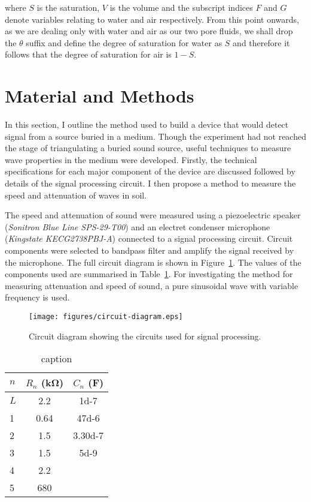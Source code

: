 \documentclass[twocolumn]{article}
\newcommand{\otoprule}{\midrule[\heavyrulewidth]}
\begin{document}
where $S$ is the saturation, $V$ is the volume and the subscript indices $F$ and $G$ denote variables relating to water and air respectively. From this point onwards, as we are dealing only with water and air as our two pore fluids, we shall drop the $\theta$ suffix and define the degree of saturation for water as $S$ and therefore it follows that the degree of saturation for air is $1 - S$.

\section{Material and Methods}
In this section, I outline the method used to build a device that would detect signal from a source buried in a medium. Though the experiment had not reached the stage of triangulating a buried sound source, useful techniques to measure wave properties in the medium were developed. Firstly, the technical specifications for each major component of the device are discussed followed by details of the signal processing circuit. I then propose a method to measure the speed and attenuation of waves in soil.

The speed and attenuation of sound were measured using a piezoelectric speaker (\textit{Sonitron Blue Line SPS-29-T00}) and an electret condenser microphone (\textit{Kingstate KECG2738PBJ-A}) connected to a signal processing circuit. Circuit components were selected to bandpass filter and amplify the signal received by the microphone. The full circuit diagram is shown in Figure~\ref{fig:circuit-diagram}. The values of the components used are summarised in Table~\ref{t:electric-components}. For investigating the method for measuring attenuation and speed of sound, a pure sinusoidal wave with variable frequency is used.

\begin{figure}
    \centering
    \texttt{[image: figures/circuit-diagram.eps]}
    \caption{Circuit diagram showing the circuits used for signal processing.}
    \label{fig:circuit-diagram}
\end{figure}
\begin{table}
    \caption{caption}
    \label{t:electric-components}
    \centering
    \begin{tabular}{lcc}
        \toprule
        $n$ & $R_n$ (\si{\kilo\ohm}) & $C_n$ (\si{\farad}) \\\otoprule
        $L$ & 2.2                    & \num{1d-7}          \\
        1   & 0.64                   & \num{47d-6}         \\
        2   & 1.5                    & \num{3.30d-7}       \\
        3   & 1.5                    & \num{5d-9}          \\
        4   & 2.2                    &                     \\
        5   & 680                    &                     \\
        \bottomrule
    \end{tabular}
\end{table}
\end{document}
